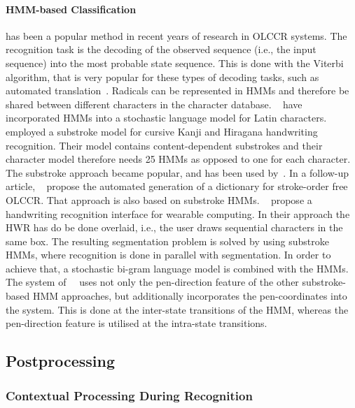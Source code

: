 \paragraph{HMM-based Classification} has been a popular method in recent years of
research in OLCCR systems. The recognition task is the decoding of the 
observed sequence (i.e., the input sequence) into the most probable state 
sequence. This is done with the Viterbi algorithm, that is very popular for
these types of decoding tasks, such as automated 
translation~. Radicals can be represented in HMMs and 
therefore be shared between different characters in the character database.
~\citeyear{Hu1996} have incorporated HMMs into a 
stochastic language model for Latin characters. 
~\citeyear{Tokuno2002} employed a substroke model for 
cursive Kanji and Hiragana handwriting recognition. Their model contains 
content-dependent substrokes and their character model therefore needs 25 HMMs
as opposed to one for each character. The substroke approach became popular,
and has been used by~. In a follow-up article, 
~\citeyear{Nakai2003} propose the automated generation of a dictionary for 
stroke-order free OLCCR. That approach is also based on substroke HMMs.
~\citeyear{Shimodaira2003} propose a handwriting recognition interface for 
wearable computing. In their approach the HWR has do be done overlaid, i.e., the
user draws sequential characters in the same box. The resulting segmentation
problem is solved by using substroke HMMs, where recognition is done in parallel
with segmentation. In order to achieve that, a stochastic bi-gram language model
is combined with the HMMs.
The system of~~\citeyear{Okumura2005} uses not only the pen-direction feature 
of the other substroke-based HMM approaches, but additionally incorporates the 
pen-coordinates into the system. This is done at the inter-state transitions of 
the HMM, whereas the pen-direction feature is utilised at the intra-state 
transitions.

\subsection{Postprocessing}
\label{sec:olccr:postprocessing}

\subsubsection{Contextual Processing During Recognition}
\label{sec:olccr:contextualprocessingduring}

